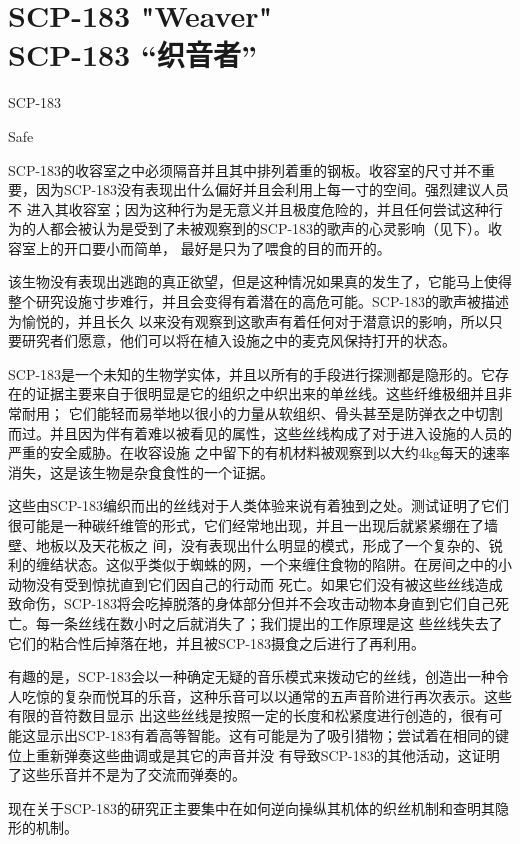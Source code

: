 \chapter[SCP-183 “织音者”]{
    SCP-183 "Weaver"\\
    SCP-183 “织音者”
}

\label{chap:SCP-183}

SCP-183

Safe

SCP-183的收容室之中必须隔音并且其中排列着重的钢板。收容室的尺寸并不重要，因为SCP-183没有表现出什么偏好并且会利用上每一寸的空间。强烈建议人员不
进入其收容室；因为这种行为是无意义并且极度危险的，并且任何尝试这种行为的人都会被认为是受到了未被观察到的SCP-183的歌声的心灵影响（见下）。收容室上的开口要小而简单，
最好是只为了喂食的目的而开的。

该生物没有表现出逃跑的真正欲望，但是这种情况如果真的发生了，它能马上使得整个研究设施寸步难行，并且会变得有着潜在的高危可能。SCP-183的歌声被描述为愉悦的，并且长久
以来没有观察到这歌声有着任何对于潜意识的影响，所以只要研究者们愿意，他们可以将在植入设施之中的麦克风保持打开的状态。

SCP-183是一个未知的生物学实体，并且以所有的手段进行探测都是隐形的。它存在的证据主要来自于很明显是它的组织之中织出来的单丝线。这些纤维极细并且非常耐用；
它们能轻而易举地以很小的力量从软组织、骨头甚至是防弹衣之中切割而过。并且因为伴有着难以被看见的属性，这些丝线构成了对于进入设施的人员的严重的安全威胁。在收容设施
之中留下的有机材料被观察到以大约4kg每天的速率消失，这是该生物是杂食食性的一个证据。

这些由SCP-183编织而出的丝线对于人类体验来说有着独到之处。测试证明了它们很可能是一种碳纤维管的形式，它们经常地出现，并且一出现后就紧紧绷在了墙壁、地板以及天花板之
间，没有表现出什么明显的模式，形成了一个复杂的、锐利的缠结状态。这似乎类似于蜘蛛的网，一个来缠住食物的陷阱。在房间之中的小动物没有受到惊扰直到它们因自己的行动而
死亡。如果它们没有被这些丝线造成致命伤，SCP-183将会吃掉脱落的身体部分但并不会攻击动物本身直到它们自己死亡。每一条丝线在数小时之后就消失了；我们提出的工作原理是这
些丝线失去了它们的粘合性后掉落在地，并且被SCP-183摄食之后进行了再利用。

有趣的是，SCP-183会以一种确定无疑的音乐模式来拨动它的丝线，创造出一种令人吃惊的复杂而悦耳的乐音，这种乐音可以以通常的五声音阶进行再次表示。这些有限的音符数目显示
出这些丝线是按照一定的长度和松紧度进行创造的，很有可能这显示出SCP-183有着高等智能。这有可能是为了吸引猎物；尝试着在相同的键位上重新弹奏这些曲调或是其它的声音并没
有导致SCP-183的其他活动，这证明了这些乐音并不是为了交流而弹奏的。

现在关于SCP-183的研究正主要集中在如何逆向操纵其机体的织丝机制和查明其隐形的机制。

